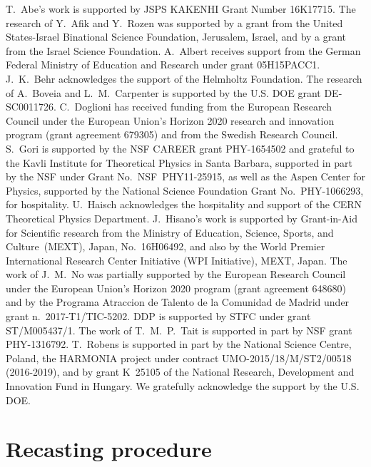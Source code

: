 \documentclass[review]{elsarticle}
\begin{document}
T.~Abe's work is supported by JSPS KAKENHI Grant Number 16K17715. The research of Y.~Afik and Y.~Rozen was supported by a grant from the United States-Israel Binational Science Foundation, Jerusalem, Israel, and by a grant from the Israel Science Foundation.  A.~Albert receives support from the German Federal Ministry of Education and Research under grant 05H15PACC1. J.~K.~Behr acknowledges the support of the Helmholtz Foundation. The research of A.~Boveia and L.~M.~Carpenter is supported by the U.S. DOE grant  DE-SC0011726.  C.~Doglioni has received funding from the European Research Council under the European Union's Horizon 2020 research and innovation program (grant agreement 679305) and from the Swedish Research Council.  S.~Gori is supported by the NSF CAREER grant PHY-1654502 and grateful to  the Kavli Institute for Theoretical Physics in Santa Barbara, supported in part by the NSF under Grant No.~NSF~PHY11-25915, as well as the Aspen Center for Physics, supported by the National Science Foundation Grant No.~PHY-1066293, for  hospitality. U.~Haisch acknowledges the hospitality and support of the CERN Theoretical Physics Department. J.~Hisano's work is supported by Grant-in-Aid for Scientific research from the Ministry of Education, Science, Sports, and Culture~(MEXT), Japan, No.~16H06492, and also by the World Premier International Research Center Initiative (WPI Initiative), MEXT, Japan.  The work of J.~M.~No was partially supported by the European Research Council under the European Union's Horizon 2020 program (grant agreement 648680) and by the Programa Atraccion de Talento de la Comunidad de Madrid under grant n.~2017-T1/TIC-5202. DDP is supported by STFC under grant ST/M005437/1.  The work of T.~M.~P.~Tait is supported in part by NSF grant PHY-1316792. T.~Robens is supported in part by the National Science Centre, Poland, the HARMONIA project under contract UMO-2015/18/M/ST2/00518 (2016-2019), and by grant K~25105 of the National Research, Development and Innovation Fund in Hungary. We gratefully acknowledge the support by the U.S. DOE. 


\appendix

\section{Recasting procedure}
\label{app:recast}
\end{document}
